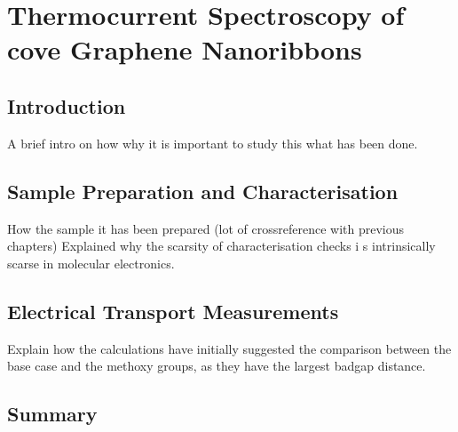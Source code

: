 \chapter{\label{ch:thermoelectric} Thermocurrent Spectroscopy of cove Graphene Nanoribbons}

\minitoc

\section{Introduction}\label{thermo:sec:intro}

A brief intro on how why it is important to study this what has been done.


\section{Sample Preparation and Characterisation}\label{thermo:sec:chara}

How the sample it has been prepared (lot of crossreference with previous chapters)
Explained why the scarsity of characterisation checks i
s intrinsically scarse in molecular electronics.


\section{Electrical Transport Measurements}\label{thermo:sec:measure}

Explain how the calculations have initially suggested the comparison between the base case and the methoxy groups,
as they have the largest badgap distance. 

\section{Summary}\label{thermo:sec:summary}